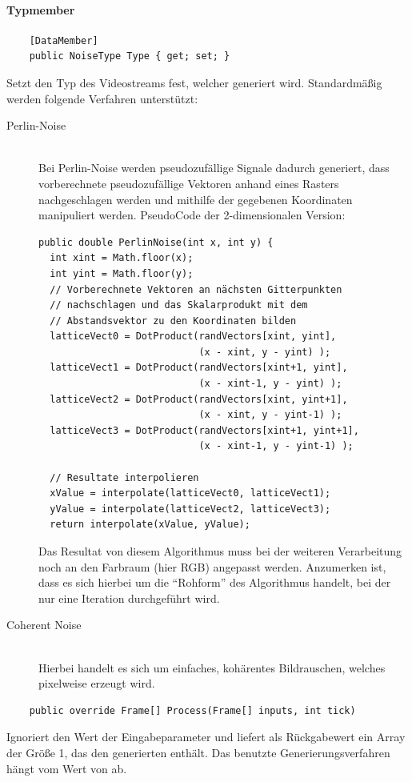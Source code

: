 \paragraph{Typmember}
\begin{itemize}

	\begin{verbatim}
	[DataMember]
	public NoiseType Type { get; set; }
	\end{verbatim}
	Setzt den Typ des Videostreams fest, welcher generiert wird. Standardmäßig werden folgende Verfahren unterstützt:
	\begin{description}
		\item[Perlin-Noise]~\\
		Bei Perlin-Noise werden pseudozufällige Signale dadurch generiert, dass vorberechnete pseudozufällige Vektoren anhand eines Rasters nachgeschlagen werden und mithilfe der gegebenen Koordinaten manipuliert werden.  PseudoCode der 2-dimensionalen Version:
\begin{verbatim}
public double PerlinNoise(int x, int y) {
  int xint = Math.floor(x);
  int yint = Math.floor(y);
  // Vorberechnete Vektoren an nächsten Gitterpunkten
  // nachschlagen und das Skalarprodukt mit dem 
  // Abstandsvektor zu den Koordinaten bilden
  latticeVect0 = DotProduct(randVectors[xint, yint],
                            (x - xint, y - yint) );
  latticeVect1 = DotProduct(randVectors[xint+1, yint], 
                            (x - xint-1, y - yint) );
  latticeVect2 = DotProduct(randVectors[xint, yint+1], 
                            (x - xint, y - yint-1) );
  latticeVect3 = DotProduct(randVectors[xint+1, yint+1], 
                            (x - xint-1, y - yint-1) );

  // Resultate interpolieren
  xValue = interpolate(latticeVect0, latticeVect1);
  yValue = interpolate(latticeVect2, latticeVect3);
  return interpolate(xValue, yValue);
\end{verbatim}
        Das Resultat von diesem Algorithmus muss bei der weiteren Verarbeitung noch an den Farbraum (hier RGB) angepasst werden. Anzumerken ist, dass es sich hierbei um die ``Rohform'' des Algorithmus handelt, bei der nur eine Iteration durchgeführt wird.
		\item[Coherent Noise]~\\
		Hierbei handelt es sich um einfaches, kohärentes Bildrauschen, welches pixelweise erzeugt wird.
	\end{description}

	\begin{verbatim}
	public override Frame[] Process(Frame[] inputs, int tick)
	\end{verbatim}
	Ignoriert den Wert der Eingabeparameter und liefert als Rückgabewert ein Array der Größe 1, das den generierten  enthält. Das benutzte Generierungsverfahren hängt vom Wert von  ab.


\end{itemize}


